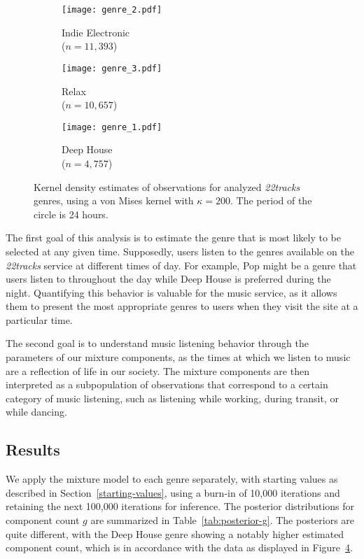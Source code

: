 \begin{figure}
	\captionsetup[subfigure]{justification=centering}
	\centering
	\begin{subfigure}[b]{0.31\textwidth}
		\texttt{[image: genre\_2.pdf]}
		\caption{Indie Electronic\\($n = 11,393$)}
		\label{fig:kernel-dens:2}
	\end{subfigure}
	\begin{subfigure}[b]{0.31\textwidth}
		\texttt{[image: genre\_3.pdf]}
		\caption{Relax\\($n = 10,657$)}
		\label{fig:kernel-dens:3}
	\end{subfigure}
	\begin{subfigure}[b]{0.31\textwidth}
		\texttt{[image: genre\_1.pdf]}
		\caption{Deep House\\($n = 4,757$)}
		\label{fig:kernel-dens:1}
	\end{subfigure}
	\caption{Kernel density estimates of observations for analyzed \textit{22tracks} genres, using a von Mises kernel with $\kappa = 200$. The period of the circle is 24 hours.}
	\label{fig:kernel-dens}
\end{figure}


The first goal of this analysis is to estimate the genre that is most likely to be selected at any given time. Supposedly, users listen to the genres available on the \textit{22tracks} service at different times of day. For example, Pop might be a genre that users listen to throughout the day while Deep House is preferred during the night. Quantifying this behavior is valuable for the music service, as it allows them to present the most appropriate genres to users when they visit the site at a particular time. 

The second goal is to understand music listening behavior through the parameters of our mixture components, as the times at which we listen to music are a reflection of life in our society. The mixture components are then interpreted as a subpopulation of observations that correspond to a certain category of music listening, such as listening while working, during transit, or while dancing.

\subsection{Results}
\label{22tracks:results}

We apply the mixture model to each genre separately, with starting values as described in Section~\ref{starting-values}, using a burn-in of 10,000 iterations and retaining the next 100,000 iterations for inference. The posterior distributions for component count $g$ are summarized in Table~\ref{tab:posterior-g}. The posteriors are quite different, with the Deep House genre showing a notably higher estimated component count, which is in accordance with the data as displayed in Figure~\ref{fig:kernel-dens}.

